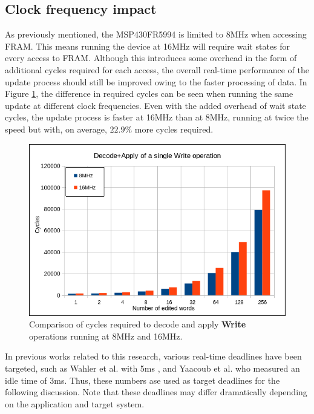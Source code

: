 \subsection{Clock frequency impact}
As previously mentioned, the MSP430FR5994 is limited to 8MHz when accessing FRAM. This means running the device at 16MHz will require wait states for every access to FRAM. Although this introduces some overhead in the form of additional cycles required for each access, the overall real-time performance of the update process should still be improved owing to the faster processing of data.  
In Figure \ref{fig:w8vs16}, the difference in required cycles can be seen when running the same update at different clock frequencies. Even with the added overhead of wait state cycles, the update process is faster at 16MHz than at 8MHz, running at twice the speed but with, on average, $22.9\%$ more cycles required. 
\begin{figure}[!ht]
    \begin{shaded}
        \centering
        \includegraphics[width=\figurewidth]{img/W8vs16.png}
        \caption{Comparison of cycles required to decode and apply \textbf{Write} operations running at 8MHz and 16MHz.}
        \label{fig:w8vs16}
    \end{shaded}
\end{figure}

In previous works related to this research, various real-time deadlines have been targeted, such as Wahler et al. with 5ms \cite{dynUpdateFramework}, and Yaacoub et al. who measured an idle time of 3ms. Thus, these numbers ase used as target deadlines for the following discussion. Note that these deadlines may differ dramatically depending on the application and target system. 

